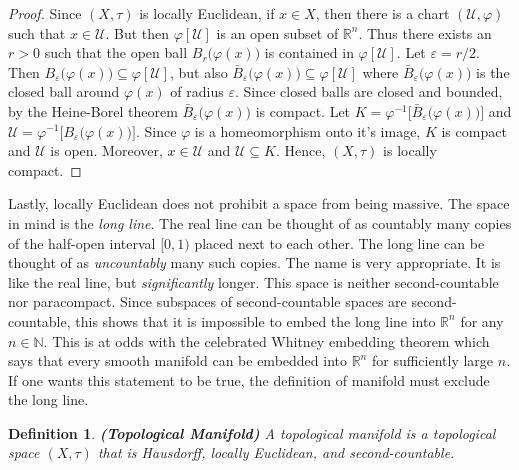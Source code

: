 \documentclass{article}
\theoremstyle{plain}
\theoremstyle{normal}
\newtheorem{definition}{Definition}[section]
\begin{document}
        \begin{proof}
            Since $(X,\tau)$ is locally Euclidean, if $x\in{X}$, then there is
            a chart $(\mathcal{U},\varphi)$ such that $x\in\mathcal{U}$. But
            then $\varphi[\mathcal{U}]$ is an open subset of $\mathbb{R}^{n}$.
            Thus there exists an $r>0$ such that the open ball
            $B_{r}\big(\varphi(x)\big)$ is contained in $\varphi[\mathcal{U}]$.
            Let $\varepsilon=r/2$. Then
            $B_{\varepsilon}\big(\varphi(x)\big)\subseteq\varphi[\mathcal{U}]$,
            but also
            $\bar{B}_{\varepsilon}\big(\varphi(x)\big)\subseteq\varphi[\mathcal{U}]$
            where $\bar{B}_{\varepsilon}\big(\varphi(x)\big)$ is the closed ball
            around $\varphi(x)$ of radius $\varepsilon$. Since
            closed balls are closed and bounded, by the Heine-Borel theorem
            $\bar{B}_{\varepsilon}\big(\varphi(x)\big)$ is compact. Let
            $K=\varphi^{-1}\big[\bar{B}_{\varepsilon}\big(\varphi(x)\big)\big]$
            and
            $\mathcal{U}=\varphi^{-1}\big[B_{\varepsilon}\big(\varphi(x)\big)\big]$.
            Since $\varphi$ is a homeomorphism onto it's image,
            $K$ is compact and $\mathcal{U}$ is open. Moreover,
            $x\in\mathcal{U}$ and $\mathcal{U}\subseteq{K}$. Hence,
            $(X,\tau)$ is locally compact.
        \end{proof}
        Lastly, locally Euclidean does not prohibit a space from being massive.
        The space in mind is the \textit{long line}. The real line can be
        thought of as countably many copies of the half-open interval $[0,1)$
        placed next to each other. The long line can be thought of as
        \textit{uncountably} many such copies. The name is very appropriate.
        It is like the real line, but \textit{significantly} longer. This space
        is neither second-countable nor paracompact. Since subspaces of
        second-countable spaces are second-countable, this shows that it is
        impossible to embed the long line into $\mathbb{R}^{n}$ for any
        $n\in\mathbb{N}$. This is at odds with the celebrated Whitney embedding
        theorem which says that every smooth manifold can be embedded into
        $\mathbb{R}^{n}$ for sufficiently large $n$. If one wants this statement
        to be true, the definition of manifold must exclude the long line.
        \begin{definition}{\textbf{(Topological Manifold)}}
            A topological manifold is a topological space $(X,\tau)$ that is
            Hausdorff, locally Euclidean, and second-countable.
        \end{definition}
\end{document}
